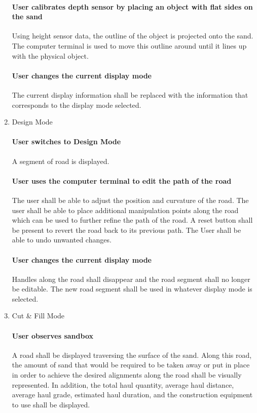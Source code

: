 \begin{enumerate}
\paragraph{User calibrates depth sensor by placing an object with flat sides on the sand}
Using height sensor data, the outline of the object is projected onto the sand. 
The computer terminal is used to move this outline around until it lines up with the physical object.

\paragraph{User changes the current display mode}
The current display information shall be replaced with the information that corresponds to the display mode selected.

\item{Design Mode}

\paragraph{User switches to Design Mode}
A segment of road is displayed.

\paragraph{User uses the computer terminal to edit the path of the road}
The user shall be able to adjust the position and curvature of the road.
The user shall be able to place additional manipulation points along the road which can be used to further refine the path of the road.
A reset button shall be present to revert the road back to its previous path.
The User shall be able to undo unwanted changes.

\paragraph{User changes the current display mode}
Handles along the road shall disappear and the road segment shall no longer be editable.
The new road segment shall be used in whatever display mode is selected.

\item{Cut \& Fill Mode}

\paragraph{User observes sandbox}
A road shall be displayed traversing the surface of the sand.  Along this road, the amount of sand that would be required to be taken away or put in place in order to achieve the desired alignments along the road shall be visually represented.  In addition, the total haul quantity, average haul distance, average haul grade, estimated haul duration, and the construction equipment to use shall be displayed.


\end{enumerate}
